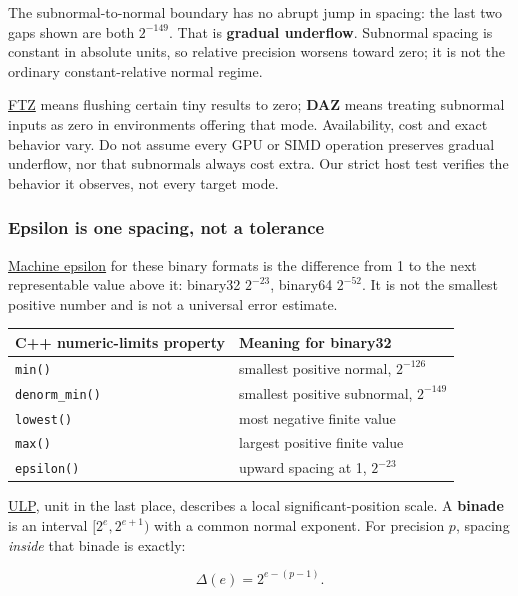 The subnormal-to-normal boundary has no abrupt jump in spacing: the last two gaps shown are both \(2^{-149}\). That is \textbf{gradual underflow}. Subnormal spacing is constant in absolute units, so relative precision worsens toward zero; it is not the ordinary constant-relative normal regime.

\hyperref[appendix-e979eb012782]{FTZ} means flushing certain tiny results to zero; \textbf{DAZ} means treating subnormal inputs as zero in environments offering that mode. Availability, cost and exact behavior vary. Do not assume every GPU or SIMD operation preserves gradual underflow, nor that subnormals always cost extra. Our strict host test verifies the behavior it observes, not every target mode.

\subsubsection{Epsilon is one spacing, not a tolerance}\label{05-engine-i-ch001-epsilon-is-one-spacing-not-a-tolerance}

\hyperref[appendix-390ea641da54]{Machine epsilon} for these binary formats is the difference from 1 to the next representable value above it: binary32 \(2^{-23}\), binary64 \(2^{-52}\). It is not the smallest positive number and is not a universal error estimate.

{\def\LTcaptype{none} %
\begin{longtable}[]{@{}ll@{}}
\toprule\noalign{}
C++ numeric-limits property & Meaning for binary32 \\
\midrule\noalign{}
\endhead
\bottomrule\noalign{}
\endlastfoot
\texttt{min()} & smallest positive normal, \(2^{-126}\) \\
\texttt{denorm\_min()} & smallest positive subnormal, \(2^{-149}\) \\
\texttt{lowest()} & most negative finite value \\
\texttt{max()} & largest positive finite value \\
\texttt{epsilon()} & upward spacing at 1, \(2^{-23}\) \\
\end{longtable}
}

\hyperref[appendix-14bab4cab9d4]{ULP}, unit in the last place, describes a local significant-position scale. A \textbf{binade} is an interval \([2^e,2^{e+1})\) with a common normal exponent. For precision \(p\), spacing \emph{inside} that binade is exactly:

\[
\Delta(e)=2^{e-(p-1)}.
\]

